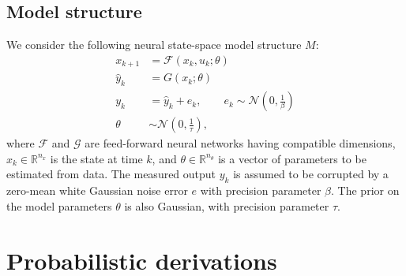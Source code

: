 \documentclass{ifacconf}
\newcommand{\nx}{{n_x}}
\newcommand{\F}{\mathcal{F}} %
\newcommand{\G}{\mathcal{G}} %
\newcommand{\N}{\mathcal{N}} %
\newcommand{\mean}[1]{\hat{#1}}
\begin{document}
\subsection{Model structure}
We consider the following neural state-space model structure $M$: 
 \begin{subequations}
  \label{eq:ss_model}
 \begin{align}
  x_{k+1} &= \F(x_k, u_k; \theta) \label{eq:ss_model_a} \\
  \mean{y}_{k} &= G(x_k; \theta) \\
  y_{k} &=  \mean{y}_{k} + e_k, \qquad e_k \sim \N\left(0, \frac{1}{\beta}\right) \label{eq:ss_model_b} \\
  \theta &\sim \N\left(0, \frac{1}{\tau}\right),
  \end{align}
\end{subequations}
where $\F$ and $\G$ are feed-forward neural networks having compatible dimensions, $x_k \in \mathbb{R}^{\nx}$ is the state at time $k$, and $\theta \in \mathbb{R}^{n_\theta}$ is a vector of parameters to be estimated from data. The measured output $y_{k}$ is assumed to be corrupted by a zero-mean white Gaussian noise error $e$ with {precision} parameter $\beta$. The prior on the model parameters $\theta$ is also Gaussian, with precision parameter $\tau$.


\section{Probabilistic derivations}
\end{document}
